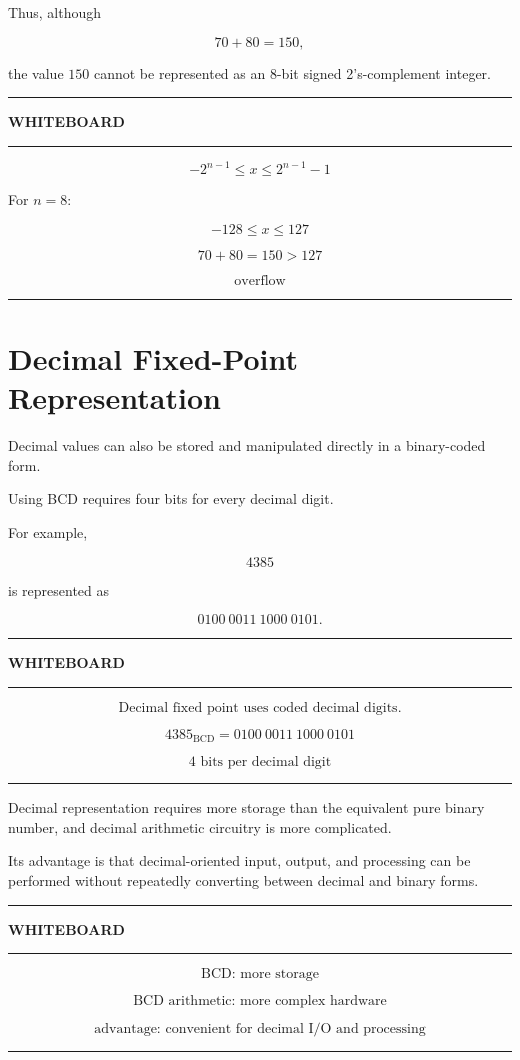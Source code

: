 \documentclass[11pt]{article}
\newenvironment{whiteboard}
{
    \par\medskip
    \begin{center}
    \begin{minipage}{0.94\textwidth}
    \hrule
    \vspace{0.4em}
    \textbf{\large WHITEBOARD}
    \vspace{0.3em}
    \hrule
    \vspace{0.7em}
}
{
    \vspace{0.5em}
    \hrule
    \end{minipage}
    \end{center}
    \medskip
}
\begin{document}
Thus, although

\[
70+80=150,
\]

the value \(150\) cannot be represented as an 8-bit signed 2's-complement
integer.

\begin{whiteboard}
\[
\boxed{-2^{n-1}\leq x\leq2^{n-1}-1}
\]

For \(n=8\):

\[
-128\leq x\leq127
\]

\[
70+80=150>127
\]

\[
\boxed{\text{overflow}}
\]
\end{whiteboard}

\section{Decimal Fixed-Point Representation}

Decimal values can also be stored and manipulated directly in a binary-coded
form.

Using BCD requires four bits for every decimal digit.

For example,

\[
4385
\]

is represented as

\[
0100\ 0011\ 1000\ 0101.
\]

\begin{whiteboard}
\[
\boxed{\text{Decimal fixed point uses coded decimal digits.}}
\]

\[
4385_{\text{BCD}}
=
0100\ 0011\ 1000\ 0101
\]

\[
\boxed{4\text{ bits per decimal digit}}
\]
\end{whiteboard}

Decimal representation requires more storage than the equivalent pure binary
number, and decimal arithmetic circuitry is more complicated.

Its advantage is that decimal-oriented input, output, and processing can be
performed without repeatedly converting between decimal and binary forms.

\begin{whiteboard}
\[
\text{BCD: more storage}
\]

\[
\text{BCD arithmetic: more complex hardware}
\]

\[
\text{advantage: convenient for decimal I/O and processing}
\]
\end{whiteboard}
\end{document}
